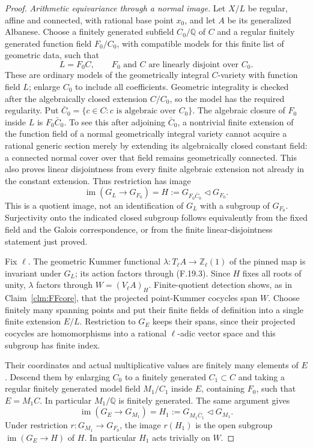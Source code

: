 \documentclass[11pt]{article}
\begin{document}
\begin{proof}
\emph{Arithmetic equivariance through a normal image.}
Let \(X/L\) be regular, affine and connected, with rational
base point \(x_0\), and let \(A\) be its generalized Albanese.
Choose a finitely generated subfield \(C_0/\mathbb Q\) of
\(C\) and a regular finitely generated function field
\(F_0/C_0\), with compatible models for this finite list of
geometric data, such that
\[
 L=F_0C,\qquad F_0\text{ and }C\text{ are linearly disjoint
 over }C_0.                                                \tag{F.19.2}
\]
These are ordinary models of the geometrically integral
\(C\)-variety with function field \(L\); enlarge \(C_0\)
to include all coefficients. Geometric integrality is checked
after the algebraically closed extension \(C/C_0\), so the
model has the required regularity. Put
\(\bar C_0=\{c\in C:c\text{ is algebraic over }C_0\}\).
The algebraic closure of \(F_0\) inside \(L\) is
\(F_0\bar C_0\). To see this after adjoining \(\bar C_0\),
a nontrivial finite extension of the function field of a normal
geometrically integral variety cannot acquire a rational generic
section merely by extending its algebraically closed constant
field: a connected normal cover over that field remains
geometrically connected. This also proves linear disjointness
from every finite algebraic extension not already in the constant
extension. Thus restriction has image
\[
 \operatorname{im}(G_L\longrightarrow G_{F_0})
           =H:=G_{F_0\bar C_0}\triangleleft G_{F_0}.       \tag{F.19.3}
\]
This is a quotient image, not an identification of \(G_L\)
with a subgroup of \(G_{F_0}\). Surjectivity onto the indicated
closed subgroup follows equivalently from the fixed field and
the Galois correspondence, or from the finite linear-disjointness
statement just proved.

Fix \(\ell\). The geometric Kummer functional
\(\lambda:T_\ell A\to\mathbb Z_\ell(1)\) of the pinned map
is invariant under \(G_L\); its action factors through (F.19.3).
Since \(H\) fixes all roots of unity, \(\lambda\) factors
through \(W=(V_\ell A)_H\). Finite-quotient detection shows,
as in Claim~\ref{clm:FFcore}, that the projected point-Kummer
cocycles span \(W\). Choose finitely many spanning points and
put their finite fields of definition into a single finite
extension \(E/L\). Restriction to \(G_E\) keeps their spans,
since their projected cocycles are homomorphisms into a rational
\(\ell\)-adic vector space and this subgroup has finite index.

Their coordinates and actual multiplicative values are finitely
many elements of \(E\). Descend them by enlarging \(C_0\)
to a finitely generated \(C_1\subset C\) and taking a
regular finitely generated model field \(M_1/C_1\) inside
\(E\), containing \(F_0\), such that
\(E=M_1C\). In particular \(M_1/\mathbb Q\) is finitely
 generated. The same argument gives
\[
 \operatorname{im}(G_E\to G_{M_1})
       =H_1:=G_{M_1\bar C_1}\triangleleft G_{M_1}.         \tag{F.19.4}
\]
Under restriction \(r:G_{M_1}\to G_{F_0}\), the image
\(r(H_1)\) is the open subgroup
\(\operatorname{im}(G_E\to H)\) of \(H\).
In particular \(H_1\) acts trivially on \(W\).


\end{proof}
\end{document}
